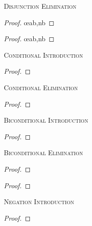 \begin{multicols}{2}
\noindent\textsc{Disjunction Elimination}

\begin{proof}
	 \oe{ab,nb}
\end{proof}

\begin{proof}
	 \oe{ab,nb}
\end{proof}
\bigskip


\noindent\textsc{Conditional Introduction}

\nopagebreak
\begin{proof}
	\open
		 
	\close
\end{proof}
\bigskip


\noindent\textsc{Conditional Elimination}

\begin{proof}
	 
\end{proof}
\bigskip

\noindent\textsc{Biconditional Introduction}

\begin{proof}
	\open
		 
	\close
	\open
		 
	\close
\end{proof}
\bigskip


\noindent\textsc{Biconditional Elimination}

\begin{proof}
	 
\end{proof}

\begin{proof}
	 
\end{proof}
\bigskip


\noindent\textsc{Negation Introduction}

\begin{proof}
	\open
		 
	\close
\end{proof}
\bigskip



\end{multicols}
